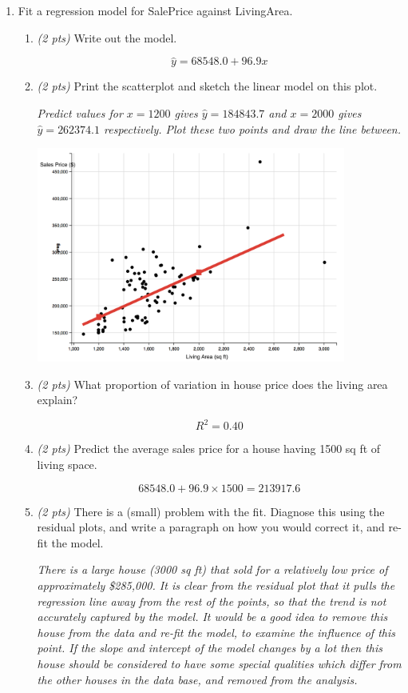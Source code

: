 \documentclass{article}
\begin{document}
\begin{enumerate}
\begin{enumerate}
\end{enumerate}

\item Fit a regression model for SalePrice against LivingArea. 

\begin{enumerate}
\item {\em (2 pts)} Write out the model. 

\[
\hat{y} = 68548.0 + 96.9x
\]

\item {\em (2 pts)} Print the scatterplot and sketch the linear model on this plot. 

{\em Predict values for $x=1200$ gives $\hat{y}=184843.7$ and $x=2000$ gives $\hat{y}=262374.1$  respectively. Plot these two points and draw the line between. }

\centerline{\includegraphics[width=4in]{hmwkch6-7-scatplot.png}}

\item {\em (2 pts)} What proportion of variation in house price does the living area explain?

\[
R^2 = 0.40
\]

\item
{\em (2 pts)} Predict the average sales price for a house having 1500 sq ft of living space.

\[
68548.0 + 96.9\times 1500 = 213917.6
\]

\item {\em (2 pts)} There is a (small) problem with the fit. Diagnose this using the residual plots, and write a paragraph on how you would correct it, and re-fit the model. 

{\em There is a large house (3000 sq ft) that sold for a relatively low price of  approximately \$285,000. It is clear from the residual plot that it pulls the regression line away from the rest of the points, so that the trend is not accurately captured by the model. It would be a good idea to remove this house from the data and re-fit the model, to examine the influence of this point. If the slope and intercept of the model changes by a lot then this house should be considered to have some special qualities which differ from the other houses in the data base, and removed from the analysis.}

\end{enumerate}

\end{enumerate}
\end{document}
